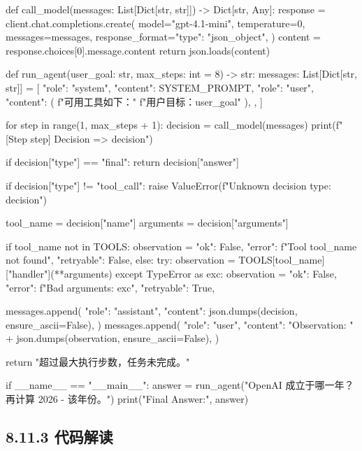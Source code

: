 \begin{codeblock}
def call_model(messages: List[Dict[str, str]]) -> Dict[str, Any]:
    response = client.chat.completions.create(
        model="gpt-4.1-mini",
        temperature=0,
        messages=messages,
        response_format={"type": "json_object"},
    )
    content = response.choices[0].message.content
    return json.loads(content)


def run_agent(user_goal: str, max_steps: int = 8) -> str:
    messages: List[Dict[str, str]] = [
        {"role": "system", "content": SYSTEM_PROMPT},
        {
            "role": "user",
            "content": (
                f"可用工具如下：\n\n"
                f"用户目标：{user_goal}"
            ),
        },
    ]

    for step in range(1, max_steps + 1):
        decision = call_model(messages)
        print(f"[Step {step}] Decision => {decision}")

        if decision["type"] == "final":
            return decision["answer"]

        if decision["type"] != "tool_call":
            raise ValueError(f"Unknown decision type: {decision}")

        tool_name = decision["name"]
        arguments = decision["arguments"]

        if tool_name not in TOOLS:
            observation = {
                "ok": False,
                "error": f"Tool {tool_name} not found",
                "retryable": False,
            }
        else:
            try:
                observation = TOOLS[tool_name]["handler"](**arguments)
            except TypeError as exc:
                observation = {
                    "ok": False,
                    "error": f"Bad arguments: {exc}",
                    "retryable": True,
                }

        messages.append(
            {
                "role": "assistant",
                "content": json.dumps(decision, ensure_ascii=False),
            }
        )
        messages.append(
            {
                "role": "user",
                "content": "Observation: " + json.dumps(observation, ensure_ascii=False),
            }
        )

    return "超过最大执行步数，任务未完成。"


if __name__ == "__main__":
    answer = run_agent("OpenAI 成立于哪一年？再计算 2026 - 该年份。")
    print("Final Answer:", answer)
\end{codeblock}

\subsection{8.11.3 代码解读}

